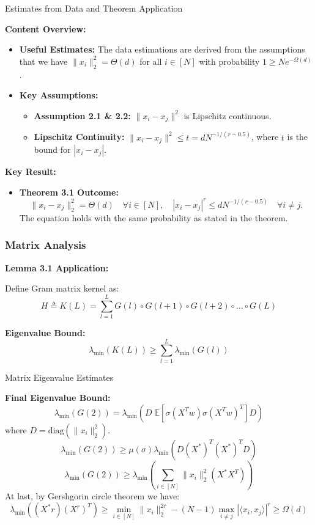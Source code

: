 \documentclass[serif, aspectratio=169]{beamer}
\begin{document}
\begin{frame}{Estimates from Data and Theorem Application}
	
	\textbf{Content Overview:}
	\begin{itemize}
		\item \textbf{Useful Estimates:}
		The data estimations are derived from the assumptions that we have \( \| x_i \|^2_2 = \Theta(d) \) for all \( i \in [N] \) with probability \( 1 \geq N e^{-\Omega(d)} \).
		\item \textbf{Key Assumptions:}
		\begin{itemize}
			\item \textbf{Assumption 2.1 \& 2.2:} \( \| x_i - x_j \|^2 \) is Lipschitz continuous.
			\item \textbf{Lipschitz Continuity:} \( \| x_i - x_j \|^2 \leq t = dN^{-1/(r-0.5)} \), where \( t \) is the bound for \( |x_i - x_j| \).
		\end{itemize}
	\end{itemize}
	
	\vspace{0.5cm}
	
	\textbf{Key Result:}
	\begin{itemize}
		\item \textbf{Theorem 3.1 Outcome:}  
		\[
		\| x_i - x_j \|^2_2 = \Theta(d) \quad \forall i \in [N], \quad |x_i - x_j|^{r} \leq dN^{-1/(r-0.5)} \quad \forall i \neq j.
		\]
		The equation holds with the same probability as stated in the theorem.
	\end{itemize}
	
\end{frame}

\begin{frame}
	\frametitle{Matrix Analysis}
	
	\textbf{Lemma 3.1 Application:}
	
	Define Gram matrix kernel as:
	\[
	H \triangleq K(L) = \sum_{l=1}^{L} G(l) \circ G(l+1) \circ G(l+2) \circ \dots \circ G(L)
	\]
	
	\vspace{0.5cm}
	
	\textbf{Eigenvalue Bound:}
	\[
	\lambda_{\min}( K(L) ) \geq \sum_{l=1}^{L} \lambda_{\min} \left( G(l) \right)
	\]
	
\end{frame}

\begin{frame}{Matrix Eigenvalue Estimates}
	
	\textbf{Final Eigenvalue Bound:}
	\[
	\lambda_{\min}( G(2) ) = \lambda_{\min}( D \; \mathbb{E}\left[ \sigma(X^T w) \sigma( X^T w )^T \right] D )
	\]
	where \( D = \text{diag}(\| x_i \|^2_2) \).
	\[
	\lambda_{\min}( G(2) ) \geq \mu(\sigma) \lambda_{\min}( D(X^*)^T (X^*)^T D )
	\]
	\[
	\lambda_{\min} \left( G(2) \right) \geq \lambda_{\min} \left( \sum_{i \in [N]} \| x_i \|^2_2 (X^* X^T) \right)
	\]
	At last, by Gershgorin circle theorem we have:
	\[
	\lambda_{\min} \left( (X^*r) (X^r)^T \right) \geq \min_{i \in [N]} \| x_i \|_2^{2r} - (N - 1) \max_{i \neq j} \left| \langle x_i, x_j \rangle \right|^r \geq \Omega(d)
	\]
\end{frame}
\end{document}
